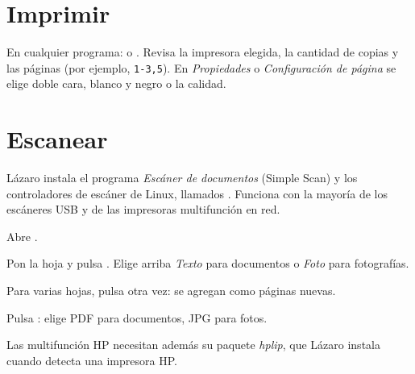 \section{Imprimir}

En cualquier programa:  o .
Revisa la impresora elegida, la cantidad de copias y las páginas (por
ejemplo, \texttt{1-3,5}). En \emph{Propiedades} o \emph{Configuración de
página} se elige doble cara, blanco y negro o la calidad.

\section{Escanear}

Lázaro instala el programa \emph{Escáner de documentos} (Simple Scan) y
los controladores de escáner de Linux, llamados 
\cite{sane}. Funciona con la mayoría de los escáneres USB y de las
impresoras multifunción en red.

\begin{pasos}
  \item Abre .
  \item Pon la hoja y pulsa . Elige arriba \emph{Texto} para
        documentos o \emph{Foto} para fotografías.
  \item Para varias hojas, pulsa  otra vez: se agregan como
        páginas nuevas.
  \item Pulsa : elige PDF para documentos, JPG para fotos.
\end{pasos}

Las multifunción HP necesitan además su paquete \emph{hplip}, que Lázaro
instala cuando detecta una impresora HP.

\fuentes
